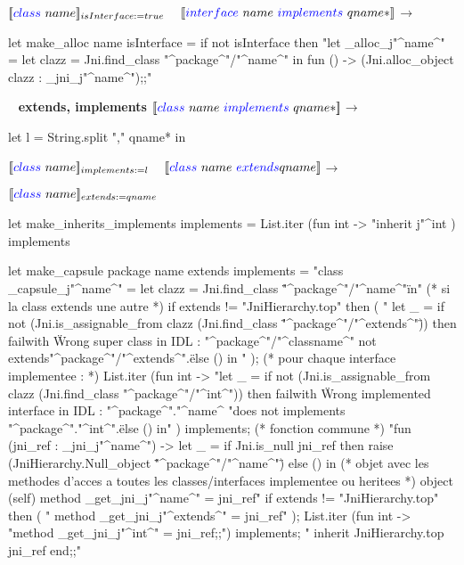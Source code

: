 \documentclass[a4paper, 11pt]{report}
\begin{document}
$[\![{\color{blue}class}\  name ]\!]_{isInterface:=true}$
\newline
\ 
\newline
\noindent
$[\![{\color{blue}interface}\  name\ {\color{blue}implements}\ qname* ]\!]$$\longrightarrow$
% 

\begin{OCaml}
let make_alloc name isInterface =
   if not isInterface then
      "let _alloc_j"^name^" =
       let clazz = Jni.find_class "^package^"/"^name^"
       in fun () -> (Jni.alloc_object clazz : _jni_j"^name^");;"
\end{OCaml}

\ 
\newline
\textbf{extends, implements}
\newline
\noindent
$[\![{\color{blue}class}\  name\ {\color{blue}implements}\ qname* ]\!]$$\longrightarrow$
% 

let l = String.split "," qname* in

$[\![{\color{blue}class}\  name ]\!]_{implements:=l}$
\newline
\ 
\newline
\noindent
\noindent
$[\![  {\color{blue}class}\ name\ {\color{blue}extends} qname ]\!]$$\longrightarrow$

$[\![  {\color{blue}class}\ name]\!]_{extends:=qname}$

\noindent
\begin{OCaml}
let make_inherits_implements implements =
   List.iter (fun int -> "inherit j"^int ) implements

let make_capsule package name extends implements =
     "class _capsule_j"^name^" =
       let clazz = Jni.find_class \""^package^"/"^name^"\"
       in"
    (* si la class extends une autre *)
    if extends != "JniHierarchy.top" then ( 
        " let _ =
           if not (Jni.is_assignable_from clazz (Jni.find_class \""^package^"/"^extends^"\"))
           then
           failwith \"Wrong super class in IDL : "^package^"/"^classname^" not extends"^package^"/"^extends^".\"
           else ()
         in "
    );
   (* pour chaque interface implementee : *)
    List.iter (fun int ->
        "let _ =
           if not (Jni.is_assignable_from clazz (Jni.find_class "^package^"/"^int^"))
           then
             failwith \"Wrong implemented interface in IDL : "^package^"."^name^ "does not implements "^package^"."^int^".\"
           else ()
        in"
    ) implements;
      (* fonction commune *)
       "fun (jni_ref : _jni_j"^name^") ->
         let _ =
           if Jni.is_null jni_ref
           then raise (JniHierarchy.Null_object \""^package^"/"^name^"\")
           else ()
         in
         (* objet avec les methodes d'acces a toutes les classes/interfaces implementee ou heritees *)
         object (self)
           method _get_jni_j"^name^" = jni_ref"
      if extends != "JniHierarchy.top" then (
          "  method _get_jni_j"^extends^" = jni_ref"
      );
      List.iter (fun int -> "method _get_jni_j"^int^" = jni_ref;;") implements;
          " inherit JniHierarchy.top jni_ref
         end;;"
  
\end{OCaml}
\end{document}
